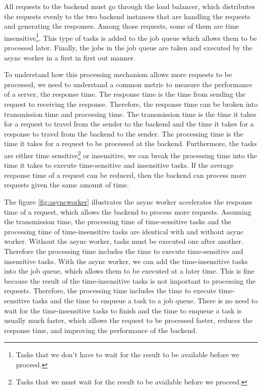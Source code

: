 \documentclass[../thesis.tex]{subfiles}
\begin{document}
All requests to the backend must go through the load balancer, which distributes the requests evenly to the two backend instances that are handling the requests and generating the responses. Among those requests, some of them are time insensitive\footnote{Tasks that we don't have to wait for the result to be available before we proceed.}. This type of tasks is added to the job queue which allows them to be processed later. Finally, the jobs in the job queue are taken and executed by the async worker in a first in first out manner.

To understand how this processing mechanism allows more requests to be processed, we need to understand a common metric to measure the performance of a server, the response time. The response time is the time from sending the request to receiving the response. Therefore, the response time can be broken into transmission time and processing time. The transmission time is the time it takes for a request to travel from the sender to the backend and the time it takes for a response to travel from the backend to the sender. The processing time is the time it takes for a request to be processed at the backend. Furthermore, the tasks are either time sensitive\footnote{Tasks that we must wait for the result to be available before we proceed.} or insensitive, we can break the processing time into the time it takes to execute time-sensitive and insensitive tasks. If the average response time of a request can be reduced, then the backend can process more requests given the same amount of time.

The figure \ref{fig:asyncworker} illustrates the async worker accelerates the response time of a request, which allows the backend to process more requests. Assuming the transmission time, the processing time of time-sensitive tasks and the processing time of time-insensitive tasks are identical with and without async worker. Without the async worker, tasks must be executed one after another. Therefore the processing time includes the time to execute time-sensitive and insensitive tasks. With the async worker, we can add the time-insensitive tasks into the job queue, which allows them to be executed at a later time. This is fine because the result of the time-insensitive tasks is not important to processing the requests. Therefore, the processing time includes the time to execute time-sensitive tasks and the time to enqueue a task to a job queue. There is no need to wait for the time-insensitive tasks to finish and the time to enqueue a task is usually much faster, which allows the request to be processed faster, reduces the response time, and improving the performance of the backend.
\end{document}
